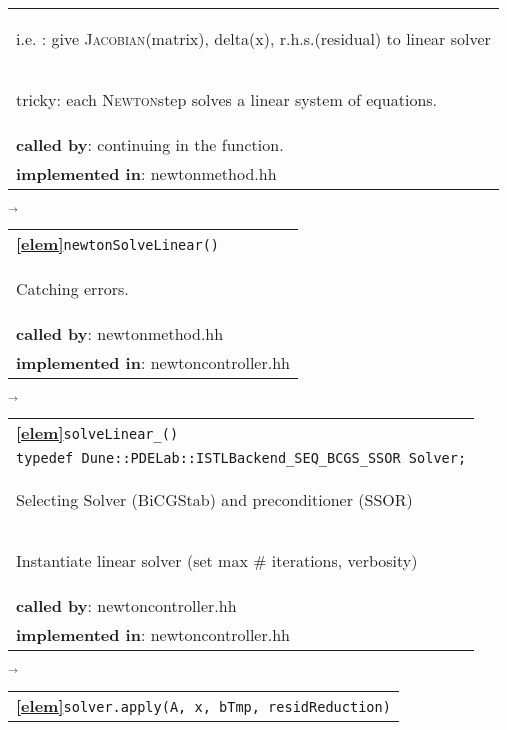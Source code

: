 \begin{landscape}
{\begin{tabular}{|l|}
      \begin{scriptsize}i.e. : give \textsc{Jacobian}(matrix), delta(x), r.h.s.(residual) to linear solver\end{scriptsize}\\
      \begin{scriptsize}tricky: each \textsc{Newton}step solves a linear system of equations. \end{scriptsize}\\
      \textbf{called by}: continuing in the function. \\ 
      \textbf{implemented in}: newtonmethod.hh\\ 
	\hline 
  \end{tabular}
\nextline
    {\scriptsize$\overrightarrow{}
    $}
   \begin{tabular}{|l|} 
      \hline 
      \textbf{\textcircled{\ref{elem}}}\verb+newtonSolveLinear()+\\ 
      \begin{scriptsize}Catching errors.\end{scriptsize}\\
      \textbf{called by}: newtonmethod.hh\\ 
      \textbf{implemented in}: newtoncontroller.hh\\ 
	\hline 
  \end{tabular}
    {\scriptsize$\overrightarrow{}
    $}
   \begin{tabular}{|l|} 
      \hline 
      \textbf{\textcircled{\ref{elem}}}\verb+solveLinear_()+\\ 
						       \verb+typedef Dune::PDELab::ISTLBackend_SEQ_BCGS_SSOR Solver;+\\
      \begin{scriptsize}Selecting Solver (BiCGStab) and preconditioner (SSOR)\end{scriptsize}\\
      \begin{scriptsize}Instantiate linear solver (set max \# iterations, verbosity)\end{scriptsize}\\
      \textbf{called by}: newtoncontroller.hh\\ 
      \textbf{implemented in}: newtoncontroller.hh\\ 
	\hline 
  \end{tabular}
\nextline
    {\scriptsize$\overrightarrow{}
    $}
   \begin{tabular}{|l|} 
      \hline 
      \textbf{\textcircled{\ref{elem}}}\verb+solver.apply(A, x, bTmp, residReduction)+\\ 

\end{tabular}}
\end{landscape}
